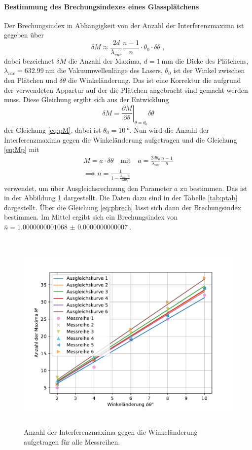 \FloatBarrier

\paragraph{Bestimmung des Brechungsindexes eines Glassplätchens}
Der Brechungsindex in Abhängigkeit von der Anzahl der Interferenzmaxima ist gegeben über
\begin{equation}
\delta M \approx \frac{2d}{\lambda_{vac}} \frac{n-1}{n} \cdot \theta_0 \cdot \delta \theta \;,
\label{eq:Mp}
\end{equation}
dabei bezeichnet $\delta M$ die Anzahl der Maxima, $d = \SI{1}{\milli\meter}$ 
die Dicke des Plätchens, $\lambda_{vac}=\SI{632.99}{\nano\meter}$ 
die Vakuumwellenlänge des Lasers, $\theta_0$ ist der Winkel zwischen 
den Plätchen und $\delta \theta$ die Winkeländerung. Das ist eine Korrektur die aufgrund der 
verwendeten Appartur auf der die Plätchen angebracht sind gemacht werden muss. 
Diese Gleichung ergibt sich aus der Entwicklung 
\begin{equation*}
\delta M = \left.\frac{\partial M}{\partial \theta} \right\rvert_{\theta = \theta_0 } \delta \theta
\end{equation*}
der Gleichung \eqref{eq:pM}, dabei ist $\theta_0 = \SI{10}{\degree}$.
Nun wird die Anzahl der Interferenzmaxima gegen die Winkeländerung aufgetragen und die Gleichung 
\eqref{eq:Mp} mit 
\begin{gather}
M = a \cdot \delta\theta \quad \text{mit} \quad a =\frac{2d \theta_0}{\lambda_{vac}} \frac{n-1}{n}
\label{eq:pfit} \\
\implies n = \frac{1}{1-\frac{\lambda_{vac} \cdot a}{2d \theta_0}} 
\label{eq:pbrech}
\end{gather}
verwendet, um über Ausgleichsrechnung den Parameter $a$ zu bestimmen. Das ist in der Abbildung 
\ref{fig:pfit} dargestellt. Die Daten dazu sind in der Tabelle \ref{tab:ptab} dargestellt.
Über die Gleichung \eqref{eq:pbrech} lässt sich dann der Brechungsindex bestimmen. Im Mittel 
ergibt sich ein Brechungsindex von $\bar{n} = \SI{1.0000000001068(7)}{}$. 
\begin{figure}
  \centering
  \includegraphics[height = 10cm]{plots/Plaettchenplot.pdf}
  \caption{Anzahl der Interferenzmaxima gegen die Winkeländerung aufgetragen für alle Messreihen.}
  \label{fig:pfit}
\end{figure}
